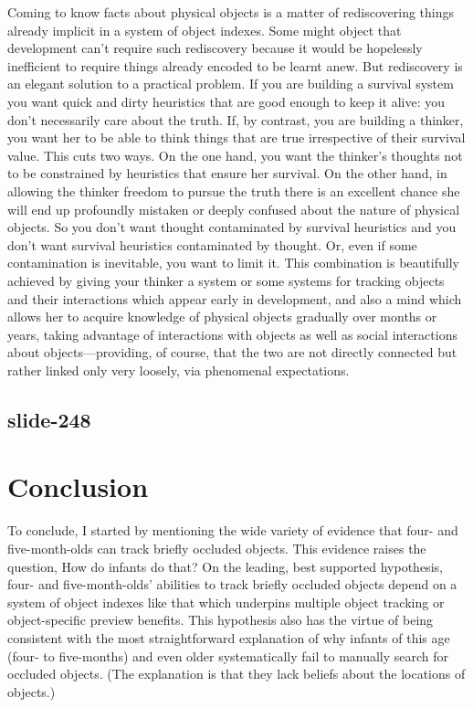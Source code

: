 \documentclass[12pt,\papersize]{extarticle}
\begin{document}
Coming to know facts about physical objects is a matter of
rediscovering things already implicit in a system of object indexes.
Some might object that development can’t require such rediscovery
because it would be hopelessly inefficient to require things already
encoded to be learnt anew.
But rediscovery is an elegant solution to a practical problem.
If you are building a survival system you want quick and dirty
heuristics that are good enough to keep it alive: you don’t
necessarily care about the truth.
If, by contrast, you are building a thinker, you want her to be
able to think things that are true irrespective of their survival value.
This cuts two ways.
On the one hand, you want the thinker’s thoughts not to be
constrained by heuristics that ensure her survival.
On the other hand, in allowing the thinker freedom to pursue the
truth there is an excellent chance she will end up profoundly
mistaken %
or deeply confused %
about the nature of physical objects.
So you don’t want thought contaminated by survival heuristics and you
don’t want survival heuristics contaminated by thought.  Or, even if
some contamination is inevitable, you want to limit it.
This combination is beautifully achieved by giving your thinker a
system or some systems for tracking objects and their interactions
which appear early in development, and also a mind which allows her
to acquire knowledge of physical objects gradually over months or
years, taking advantage of interactions with objects as well as
social interactions about objects—providing, of course, that the
two are not directly connected but rather linked only very loosely,
via phenomenal expectations.

\subsection{slide-248}
\section{Conclusion}

To conclude,
I started by mentioning the wide variety of evidence that
four- and five-month-olds can track briefly occluded objects.
This evidence raises the question, How do infants do that?
On the leading, best supported hypothesis,
four- and five-month-olds’ abilities to track briefly occluded objects
depend on a system of object indexes like that which underpins multiple
object tracking or object-specific preview benefits.
This hypothesis
also has the virtue of being consistent with the most straightforward
explanation of why infants of this age (four- to five-months) and even older
systematically fail to manually search for occluded objects.
(The explanation is that they lack beliefs about the locations of objects.)
\end{document}
